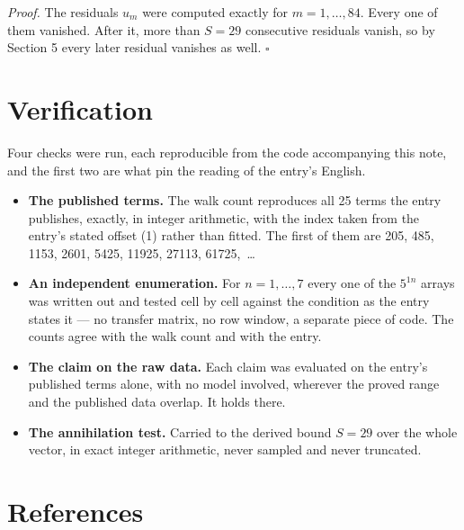 \documentclass[11pt]{article}
\theoremstyle{definition}
\begin{document}
{\itshape Proof.} The residuals $u_m$ were computed exactly for $m = 1,\dots,84$. Every one of them vanished. After it, more than $S = 29$ consecutive residuals vanish, so by Section 5 every later residual vanishes as well. $\square$

\section{Verification}

Four checks were run, each reproducible from the code accompanying this note, and the first two are what pin the reading of the entry's English.

\begin{itemize}

\item {\bfseries The published terms.} The walk count reproduces all 25 terms the entry publishes, exactly, in integer arithmetic, with the index taken from the entry's stated offset (1) rather than fitted. The first of them are 205, 485, 1153, 2601, 5425, 11925, 27113, 61725,~\dots

\item {\bfseries An independent enumeration.} For $n = 1,\dots,7$ every one of the $5^{1n}$ arrays was written out and tested cell by cell against the condition as the entry states it --- no transfer matrix, no row window, a separate piece of code. The counts agree with the walk count and with the entry.

\item {\bfseries The claim on the raw data.} Each claim was evaluated on the entry's published terms alone, with no model involved, wherever the proved range and the published data overlap. It holds there.

\item {\bfseries The annihilation test.} Carried to the derived bound $S = 29$ over the whole vector, in exact integer arithmetic, never sampled and never truncated.

\end{itemize}

\section{References}
\end{document}
